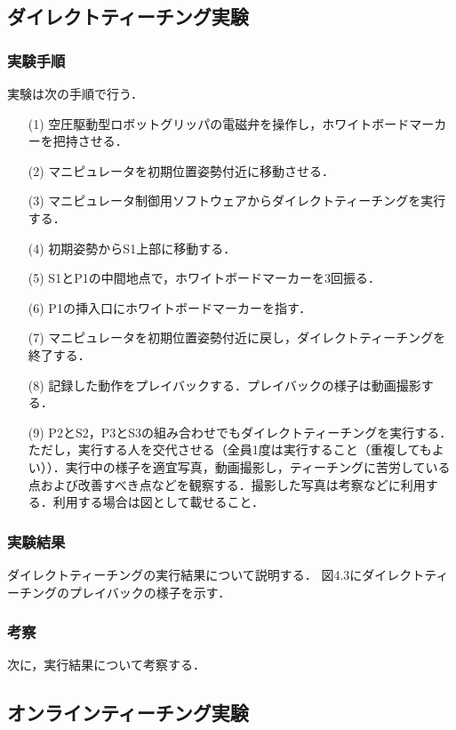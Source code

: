 \subsection{ダイレクトティーチング実験}

\subsubsection{実験手順}
実験は次の手順で行う．

\begin{enumerate}
  \item[(1)] 空圧駆動型ロボットグリッパの電磁弁を操作し，ホワイトボードマーカーを把持させる．
  \item[(2)] マニピュレータを初期位置姿勢付近に移動させる．
  \item[(3)] マニピュレータ制御用ソフトウェアからダイレクトティーチングを実行する．
  \item[(4)] 初期姿勢からS1上部に移動する．
  \item[(5)] S1とP1の中間地点で，ホワイトボードマーカーを3回振る．
  \item[(6)] P1の挿入口にホワイトボードマーカーを指す．
  \item[(7)] マニピュレータを初期位置姿勢付近に戻し，ダイレクトティーチングを終了する．
  \item[(8)] 記録した動作をプレイバックする．プレイバックの様子は動画撮影する．
  \item[(9)] P2とS2，P3とS3の組み合わせでもダイレクトティーチングを実行する．ただし，実行する人を交代させる（全員1度は実行すること（重複してもよい））．実行中の様子を適宜写真，動画撮影し，ティーチングに苦労している点および改善すべき点などを観察する．撮影した写真は考察などに利用する．利用する場合は図として載せること．
\end{enumerate}

\subsubsection{実験結果}
ダイレクトティーチングの実行結果について説明する．
図4.3にダイレクトティーチングのプレイバックの様子を示す．

\subsubsection{考察}
次に，実行結果について考察する．

\subsection{オンラインティーチング実験}

